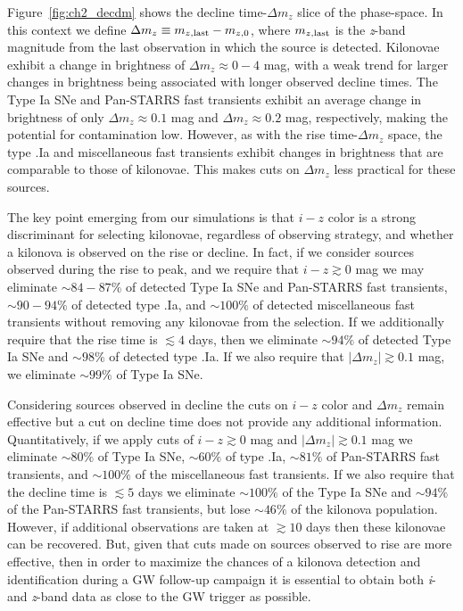 Figure~\ref{fig:ch2_decdm} shows the decline time-$\Delta m_z$ slice of the phase-space. In this context we define $\Delta m_z \equiv m_{z,{\rm last}} - m_{z,{\rm 0}}$, where $m_{z,{\rm last}}$ is the {\em z}-band magnitude from the last observation in which the source is detected. Kilonovae exhibit a change in brightness of $\Delta m_z \approx 0 - 4$ mag, with a weak trend for larger changes in brightness being associated with longer observed decline times. The Type Ia SNe and Pan-STARRS fast transients exhibit an average change in brightness of only $\Delta m_z \approx 0.1$ mag and $\Delta m_z \approx 0.2$ mag, respectively, making the potential for contamination low. However, as with the rise time-$\Delta m_z$ space, the type .Ia and miscellaneous fast transients exhibit changes in brightness that are comparable to those of kilonovae. This makes cuts on $\Delta m_z$ less practical for these sources.

The key point emerging from our simulations is that $i-z$ color is a strong discriminant for selecting kilonovae, regardless of observing strategy, and whether a kilonova is observed on the rise or decline. In fact, if we consider sources observed during the rise to peak, and we require that $i-z\gtrsim0$ mag we may eliminate $\sim84-87\%$ of detected Type Ia SNe and Pan-STARRS fast transients, $\sim90-94\%$ of detected type .Ia, and $\sim100\%$ of detected miscellaneous fast transients without removing any kilonovae from the selection. If we additionally require that the rise time is $\lesssim4$ days, then we eliminate $\sim94\%$ of detected Type Ia SNe and $\sim98\%$ of detected type .Ia. If we also require that $|\Delta m_z| \gtrsim 0.1$ mag, we eliminate $\sim99\%$ of Type Ia SNe.

Considering sources observed in decline the cuts on $i-z$ color and $\Delta m_z$ remain effective but a cut on decline time does not provide any additional information. Quantitatively, if we apply cuts of $i-z \gtrsim 0$ mag and $|\Delta m_z| \gtrsim 0.1$ mag we eliminate $\sim80\%$ of Type Ia SNe, $\sim60\%$ of type .Ia, $\sim81\%$ of Pan-STARRS fast transients, and $\sim 100\%$ of the miscellaneous fast transients. If we also require that the decline time is $\lesssim 5$ days we eliminate $\sim 100\%$ of the Type Ia SNe and $\sim94\%$ of the Pan-STARRS fast transients, but lose $\sim46\%$ of the kilonova population. However, if additional observations are taken at $\gtrsim10$ days then these kilonovae can be recovered. But, given that cuts made on sources observed to rise are more effective, then in order to maximize the chances of a kilonova detection and identification during a GW follow-up campaign it is essential to obtain both {\em i}- and {\em z}-band data as close to the GW trigger as possible.

